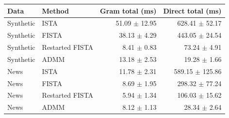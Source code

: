 \begin{tabular}{llrr}
\toprule
Data & Method & Gram total (ms) & Direct total (ms) \\
\midrule
Synthetic & ISTA & 51.09 $\pm$ 12.95 & 628.41 $\pm$ 52.17 \\
Synthetic & FISTA & 38.13 $\pm$ 4.29 & 443.05 $\pm$ 24.54 \\
Synthetic & Restarted FISTA & 8.41 $\pm$ 0.83 & 73.24 $\pm$ 4.91 \\
Synthetic & ADMM & 13.18 $\pm$ 2.53 & 19.28 $\pm$ 1.66 \\
News & ISTA & 11.78 $\pm$ 2.31 & 589.15 $\pm$ 125.86 \\
News & FISTA & 8.69 $\pm$ 1.95 & 298.32 $\pm$ 77.24 \\
News & Restarted FISTA & 5.94 $\pm$ 1.34 & 106.03 $\pm$ 15.62 \\
News & ADMM & 8.12 $\pm$ 1.13 & 28.34 $\pm$ 2.64 \\
\bottomrule
\end{tabular}
